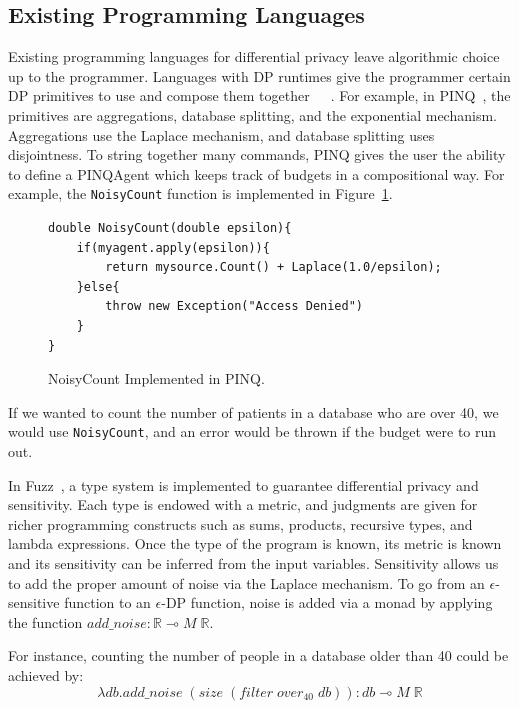 \documentclass[11pt]{report}
\renewcommand{\t}[1]{\texttt{#1}}
\begin{document}
\subsection{Existing Programming Languages}
Existing programming languages for differential privacy leave algorithmic choice up to the programmer. Languages with DP runtimes give the programmer certain DP primitives to use and compose them together~\cite{McSherry:2010}~\cite{Proserpio:2014}~\cite{Johnson:2017}. For example, in PINQ~\cite{McSherry:2010}, the primitives are aggregations, database splitting, and the exponential mechanism. Aggregations use the Laplace mechanism, and database splitting uses disjointness. To string together many commands, PINQ gives the user the ability to define a PINQAgent which keeps track of budgets in a compositional way. For example, the \t{NoisyCount} function is implemented in Figure~\ref{fig:PINQNoisyCount}.

\begin{figure}
\begin{lstlisting}[style=myCStyle]
double NoisyCount(double epsilon){
    if(myagent.apply(epsilon)){
        return mysource.Count() + Laplace(1.0/epsilon);
    }else{
        throw new Exception("Access Denied")
    }
}
\end{lstlisting}
\caption{NoisyCount Implemented in PINQ.}
\label{fig:PINQNoisyCount}
\end{figure}

If we wanted to count the number of patients in a database who are over 40, we would use \t{NoisyCount}, and an error would be thrown if the budget were to run out.

In Fuzz~\cite{Reed:2010}, a type system is implemented to guarantee differential privacy and sensitivity. Each type is endowed with a metric, and judgments are given for richer programming constructs such as sums, products, recursive types, and lambda expressions. Once the type of the program is known, its metric is known and its sensitivity can be inferred from the input variables. Sensitivity allows us to add the proper amount of noise via the Laplace mechanism. To go from an $\epsilon$-sensitive function to an $\epsilon$-DP function, noise is added via a monad by applying the function $add\_noise : \mathbb{R} \multimap M\;\mathbb{R}$.

For instance, counting the number of people in a database older than 40 could be achieved by:
\[
\lambda db.add\_noise\;(size\;(filter\;over_{40}\;db)) : db \multimap M\;\mathbb{R}
\]
\end{document}
